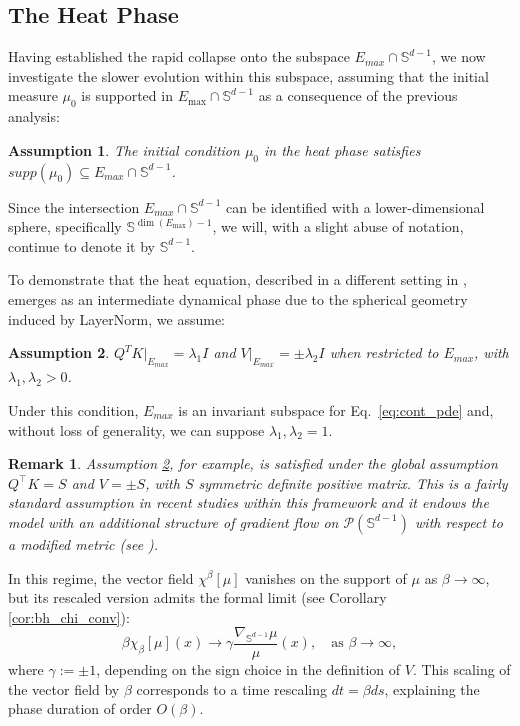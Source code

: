 \documentclass{article}
\numberwithin{theorem}{section}
\newtheorem{remark}[theorem]{Remark}
\newtheorem{assumption}{Assumption}
\begin{document}
\subsection{The Heat Phase}\label{sec:heat}
\label{sec:second_phase}
Having established the rapid collapse onto the subspace $E_{max} \cap \mathbb{S}^{d-1}$, we now investigate the slower evolution within this subspace, assuming that the initial measure $\mu_0$ is supported in $E_{\max} \cap \mathbb{S}^{d-1}$ as a consequence of the previous analysis: 
\begin{assumption}
\label{ass:e_max}
    The initial condition $\mu_0$ in the heat phase satisfies $supp(\mu_0)\subseteq E_{max}\cap\mathbb{S}^{d-1}$.
\end{assumption}
Since the intersection $E_{max}\cap\mathbb{S}^{d-1}$ can be identified with a lower-dimensional sphere, specifically $\mathbb{S}^{\dim(E_{\max}) - 1}$, we will, with a slight abuse of notation, continue to denote it by $\mathbb{S}^{d-1}$.


To demonstrate that the heat equation, described in a different setting in \cite{sander2022sinkformers}, emerges as an intermediate dynamical phase due to the spherical geometry induced by LayerNorm, we assume:

\begin{assumption}\label{a:S}$Q^TK|_{E_{max}}=\lambda_1 I$ and $V|_{E_{max}}=\pm\lambda_2 I$  when restricted to $E_{max}$, with $\lambda_1,\lambda_2>0$.
\end{assumption}

Under this condition, $E_{max}$ is an invariant subspace for Eq.~\eqref{eq:cont_pde} and, without loss of generality, we can suppose $\lambda_1,\lambda_2 =1$.
 
\begin{remark}
Assumption \ref{a:S}, for example, is satisfied under the global assumption $Q^\top K = S$ and $V=\pm S$, with $S$ symmetric definite positive matrix. This is a fairly standard assumption in recent studies within this framework and it endows the model with  an additional structure of gradient flow on $\mathcal{P}(\mathbb{S}^{d-1})$ with respect to a modified metric (see \cite{burger2025analysis, geshkovski2023mathematical}).
\end{remark}

In this regime, the vector field $\chi^\beta[\mu]$ vanishes on the support of $\mu$ as $\beta \to \infty$, but its rescaled version admits the formal limit (see Corollary \ref{cor:bh_chi_conv}):
$$
\beta \chi_\beta[\mu](x) \to \gamma \frac{\nabla_{\mathbb{S}^{d-1}} \mu}{\mu}(x), \quad \text{as } \beta \to \infty,
$$
where $\gamma:=\pm 1$, depending on the sign choice in the definition of $V$.
This scaling of the vector field by $\beta$ corresponds to a time rescaling $dt = \beta ds$, explaining the phase duration of order $O(\beta)$. 
\end{document}
